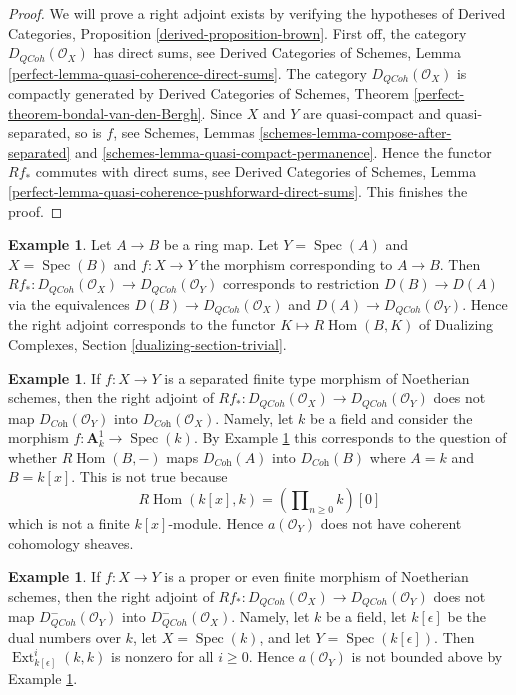 \documentclass{stacks-project}
\theoremstyle{plain}
\theoremstyle{definition}
\newtheorem{example}[subsection]{Example}
\theoremstyle{remark}
\numberwithin{equation}{subsection}
\def\Spec{\mathop{\mathrm{Spec}}}
\def\Hom{\mathop{\mathrm{Hom}}\nolimits}
\def\Ext{\mathop{\mathrm{Ext}}\nolimits}
\def\QCoh{\mathit{QCoh}}
\begin{document}
\begin{proof}
We will prove a right adjoint exists by verifying the hypotheses of
Derived Categories, Proposition \ref{derived-proposition-brown}.
First off, the category $D_\QCoh(\mathcal{O}_X)$ has direct sums, see
Derived Categories of Schemes, Lemma
\ref{perfect-lemma-quasi-coherence-direct-sums}.
The category $D_\QCoh(\mathcal{O}_X)$ is compactly generated by
Derived Categories of Schemes, Theorem
\ref{perfect-theorem-bondal-van-den-Bergh}.
Since $X$ and $Y$ are quasi-compact and quasi-separated, so is $f$, see
Schemes, Lemmas \ref{schemes-lemma-compose-after-separated} and
\ref{schemes-lemma-quasi-compact-permanence}.
Hence the functor $Rf_*$ commutes with direct sums, see
Derived Categories of Schemes, Lemma
\ref{perfect-lemma-quasi-coherence-pushforward-direct-sums}.
This finishes the proof.
\end{proof}

\begin{example}
\label{example-affine-twisted-inverse-image}
Let $A \to B$ be a ring map. Let $Y = \Spec(A)$ and $X = \Spec(B)$
and $f : X \to Y$ the morphism corresponding to $A \to B$.
Then $Rf_* : D_\QCoh(\mathcal{O}_X) \to D_\QCoh(\mathcal{O}_Y)$
corresponds to restriction $D(B) \to D(A)$ via
the equivalences $D(B) \to D_\QCoh(\mathcal{O}_X)$ and
$D(A) \to D_\QCoh(\mathcal{O}_Y)$. Hence the right adjoint
corresponds to the functor $K \longmapsto R\Hom(B, K)$ of
Dualizing Complexes, Section \ref{dualizing-section-trivial}.
\end{example}

\begin{example}
\label{example-does-not-preserve-coherent}
If $f : X \to Y$ is a separated finite type morphism of Noetherian schemes,
then the right adjoint of
$Rf_* : D_\QCoh(\mathcal{O}_X) \to D_\QCoh(\mathcal{O}_Y)$ does not map
$D_{\textit{Coh}}(\mathcal{O}_Y)$ into
$D_{\textit{Coh}}(\mathcal{O}_X)$. Namely, let $k$ be a field and
consider the morphism $f : \mathbf{A}^1_k \to \Spec(k)$. By
Example \ref{example-affine-twisted-inverse-image}
this corresponds to the question of whether
$R\Hom(B, -)$ maps $D_{\textit{Coh}}(A)$ into $D_{\textit{Coh}}(B)$
where $A = k$ and $B = k[x]$. This is not true because
$$
R\Hom(k[x], k) = \left(\prod\nolimits_{n \geq 0} k\right)[0]
$$
which is not a finite $k[x]$-module. Hence $a(\mathcal{O}_Y)$
does not have coherent cohomology sheaves.
\end{example}

\begin{example}
\label{example-does-not-preserve-bounded-above}
If $f : X \to Y$ is a proper or even finite morphism of Noetherian schemes,
then the right adjoint of
$Rf_* : D_\QCoh(\mathcal{O}_X) \to D_\QCoh(\mathcal{O}_Y)$
does not map $D_\QCoh^-(\mathcal{O}_Y)$ into
$D_\QCoh^-(\mathcal{O}_X)$. Namely, let $k$ be a field, let
$k[\epsilon]$ be the dual numbers over $k$, let
$X = \Spec(k)$, and let $Y = \Spec(k[\epsilon])$.
Then $\Ext^i_{k[\epsilon]}(k, k)$ is nonzero for all $i \geq 0$.
Hence $a(\mathcal{O}_Y)$ is not bounded above
by Example \ref{example-affine-twisted-inverse-image}.
\end{example}
\end{document}
